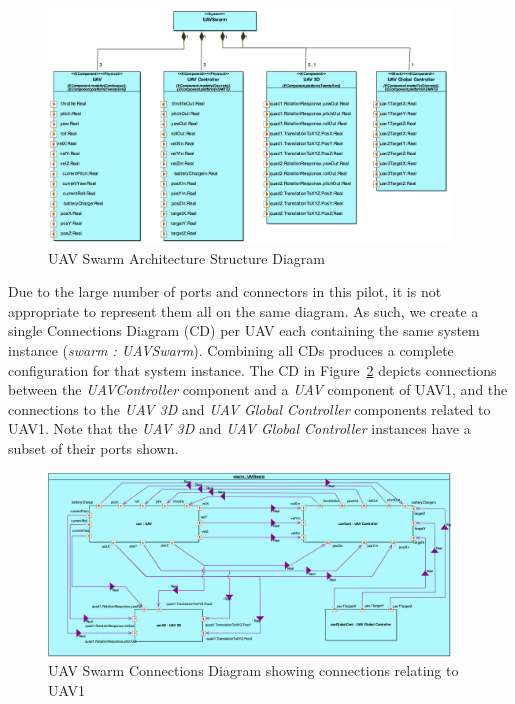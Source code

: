\begin{figure}[htbp]
\begin{center}
\includegraphics[width=0.95\textwidth]{uavswarm/swarm_asd}
\caption{UAV Swarm Architecture Structure Diagram}
\label{fig:uav_asd}
\end{center}
\end{figure}

Due to the large number of ports and connectors in this pilot, it is not appropriate to represent them all on the same diagram. As such, we create a single Connections Diagram (CD) per UAV each containing the same system instance (\emph{swarm : UAVSwarm}). Combining all CDs produces a complete configuration for that system instance.  The CD in Figure~\ref{fig:uav1_cd} depicts connections between the \emph{UAVController} component and a \emph{UAV} component of UAV1, and the connections to the \emph{UAV 3D} and \emph{UAV Global Controller} components related to UAV1. Note that the \emph{UAV 3D} and \emph{UAV Global Controller} instances have a subset of their ports shown.

\begin{figure}[htbp]
\begin{center}
\includegraphics[width=0.95\textwidth]{uavswarm/swarm_cd}
\caption{UAV Swarm Connections Diagram showing connections relating to UAV1}
\label{fig:uav1_cd}
\end{center}
\end{figure}


